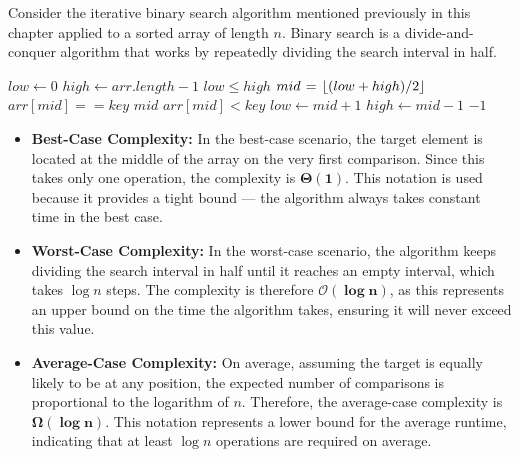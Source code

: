 \begin{example}


Consider the iterative binary search algorithm mentioned previously in this chapter applied to a sorted array of length $n$. Binary search is a divide-and-conquer algorithm that works by repeatedly dividing the search interval in half.

\begin{codebox}
    \li $low \gets 0$ 
    \li $high \gets arr.length -1$ 
    \li \While $low \leq high$ \Do
    \li     $mid \mathrel{\hspace{1pt}=\hspace{1pt}} \left\lfloor (low + high) / 2 \right\rfloor$ 
    \li     \If $arr[mid] == key$ \Then
    \li         \Return $mid$ 
    \li     \ElseIf $arr[mid] < key$ \Then
    \li         $low \gets mid + 1$ 
    \li     \Else
    \li         $high \gets mid - 1$ 
        \End
        \End
    \li \Return $-1$ 
\end{codebox}

\begin{itemize}
    \item \textbf{Best-Case Complexity: } 
    In the best-case scenario, the target element is located at the middle of the array on the very first comparison. Since this takes only one operation, the complexity is $\boldsymbol{\Theta(1)}$. This notation is used because it provides a tight bound — the algorithm always takes constant time in the best case.

    \item \textbf{Worst-Case Complexity: }
    In the worst-case scenario, the algorithm keeps dividing the search interval in half until it reaches an empty interval, which takes $\log n$ steps. The complexity is therefore $\boldsymbol{\mathcal{O}(\log n)}$, as this represents an upper bound on the time the algorithm takes, ensuring it will never exceed this value.

    \item \textbf{Average-Case Complexity: }  
    On average, assuming the target is equally likely to be at any position, the expected number of comparisons is proportional to the logarithm of $n$. Therefore, the average-case complexity is $\boldsymbol{\Omega(\log n)}$. This notation represents a lower bound for the average runtime, indicating that at least $\log n$ operations are required on average.
\end{itemize}
\end{example}

